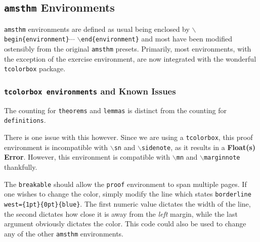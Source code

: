 \documentclass[10pt]{article}
\begin{document}
	\newpage
	\subsection{\texttt{amsthm} Environments}\label{Sub:Special}
	\texttt{amsthm} environments are defined as usual being enclosed by \texttt{$\backslash$begin\{environment\}}$\cdots$ \texttt{$\backslash$end\{environment\}} and most have been modified ostensibly from the original \texttt{amsthm} presets. Primarily, most environments, with the exception of the exercise environment, are now integrated with the wonderful \texttt{tcolorbox} package.
	\subsubsection{\texttt{tcolorbox environments} and Known Issues} %
	\label{ssub:tcolorbox environments_and_known_issues}
	The counting for \texttt{theorems} and \texttt{lemmas} is distinct from the counting for \texttt{definitions}.

	There is one issue with this however. Since we are using a \texttt{tcolorbox}, this proof environment is incompatible with \texttt{$\backslash$sn} and \texttt{$\backslash$sidenote}, as it results in a \textbf{Float(s) Error}. However, this environment is compatible with \texttt{$\backslash$mn} and \texttt{$\backslash$marginnote} thankfully.


	The \texttt{breakable} should allow the \texttt{proof} environment to span multiple pages. If one wishes to change the color, simply modify the line which states \texttt{borderline west=\{1pt\}\{0pt\}\{blue\}}. The first numeric value dictates the width of the line, the second dictates how close it is away from the \textit{left} margin, while the last argument obviously dictates the color. This code could also be used to change any of the other \texttt{amsthm} environments.\\
\end{document}
